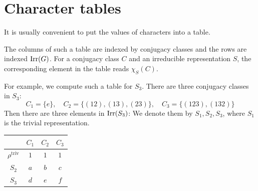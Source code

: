 \documentclass[twoside = false,	%
		headsepline,		%
		parskip = true,
		]{scrbook}						%
\begin{document}
\section{Character tables}
    It is usually convenient to put the values of characters into a table.

    The columns of such a table are indexed by conjugacy classes and the rows are indexed $\mathrm{Irr}(G)$. For a conjugacy class $C$ and an irreducible representation $S$, the corresponding element in the table reads $\chi_S(C)$.

    For example, we compute such a table for $S_3$. There are three conjugacy classes in $S_3$:
    \begin{equation*}
        C_1 = \{e\}, \quad C_2 = \{(12),(13),(23)\}, \quad C_3 = \{(123),(132)\}
    \end{equation*}
    Then there are three elements in $\mathrm{Irr}(S_3)$:
    We denote them by $S_1, S_2, S_3$, where $S_1$ is the trivial representation.
    \begin{table}[ht]
        \centering
        \begin{tabular}{|c|c|c|c|}
        \hline
             & $C_1$ & $C_2$ & $C_3$  \\ \hline
            $\rho^{\text{triv}}$ & $1$ & $1$ & $1$  \\ \hline
            $S_2$ & $a$ & $b$ & $c$ \\ \hline 
            $S_3$ & $d$ & $e$ & $f$ \\ \hline
        \end{tabular}
    \end{table}
\end{document}
